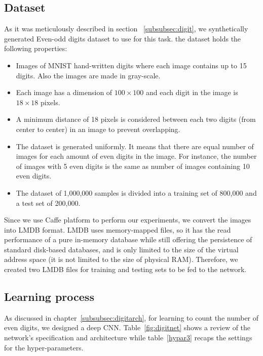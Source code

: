 \subsection{Dataset} 
As it was meticulously described in section ~\ref{subsubsec:digit}, we synthetically generated Even-odd digits dataset to use for this task. the dataset holds the following properties:
\begin{itemize}
\item Images of MNIST hand-written digits where each image contains up to 15 digits. Also the images are made in gray-scale.
\item Each image has a dimension of $100\times100$ and each digit in the image is $18\times18$ pixels.  
\item A minimum distance of 18 pixels is considered between each two digits (from center to center) in an image to prevent overlapping.
\item The dataset is generated uniformly. It means that there are equal number of images for each amount of even digits in the image. For instance, the number of images with 5 even digits is the same as number of images containing 10 even digits.
\item The dataset of 1,000,000 samples is divided into a training set of 800,000 and a test set of 200,000. 
\end{itemize}

Since we use Caffe platform to perform our experiments, we convert the images into LMDB format. LMDB uses memory-mapped files, so it has the read performance of a pure in-memory database while still offering the persistence of standard disk-based databases, and is only limited to the size of the virtual address space (it is not limited to the size of physical RAM). Therefore, we created two LMDB files for training and testing sets to be fed to the network.  

\subsection{Learning process}

As discussed in chapter~\ref{subsubsec:digitarch}, for learning to count the number of even digits, we designed a deep CNN. Table~\ref{fig:digitnet} shows a review of the network's specification and architecture while table~\ref{hypar3} recaps the settings for the hyper-parameters.


